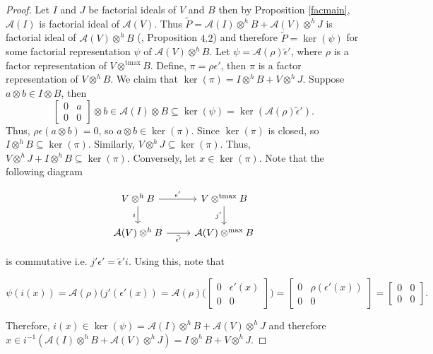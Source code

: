 \documentclass{birkjour}
\theoremstyle{definition}
\theoremstyle{remark}
\numberwithin{equation}{section}
\begin{document}
    \begin{proof}
     Let $I$ and $J$ be factorial ideals of $V$ and $B$ then by Proposition \ref{facmain}, $\mathcal{A}(I)$ is factorial ideal of $\mathcal{A}(V)$. Thus $\tilde{P}=\mathcal{A}(I) \otimes^h B+ \mathcal{A}(V) \otimes^h J$ is factorial ideal of $\mathcal{A}(V) \otimes^h B$ (\cite{AR}, Proposition $4.2$) and therefore $\tilde{P}= \operatorname{ker}(\psi)$ for some  factorial representation $\psi$ of $\mathcal{A}(V) \otimes^h B$. Let $\psi= \mathcal{A}(\rho)  \tilde{\epsilon}'$, where $\rho$ is a factor representation of $V \otimes^{\text{tmax}}B$. Define, $\pi= \rho  \epsilon'$, then $\pi$ is a factor representation of $V \otimes^h B$. We claim that $\operatorname{ker}(\pi)= I \otimes^h B+ V \otimes^h J$. Suppose $a \otimes b \in I \otimes B$, then  \[ 
\begin{bmatrix}
    0      & a \\
    0      & 0
\end{bmatrix}\otimes b  \in \mathcal{A}(I) \otimes B \subseteq \operatorname{ker}(\psi) =\operatorname{ker}(\mathcal{A}(\rho) \tilde{\epsilon}').
\] 
Thus, $\rho  \epsilon(a \otimes b)=0$, so $a \otimes b \in \operatorname{ker}(\pi)$. Since $\operatorname{ker}(\pi)$ is closed, so $I \otimes^h B \subseteq \operatorname{ker}(\pi)$. Similarly, $V \otimes^h J \subseteq \operatorname{ker}(\pi)$. Thus, $V \otimes^h J+ I \otimes^h B \subseteq \operatorname{ker}(\pi)$. Conversely, let $x \in \operatorname{ker}(\pi)$. Note that the following diagram


\[
\begin{tikzcd}
  V \otimes^h B
    \arrow[r, "\epsilon'"]
    \arrow[d, swap, "i"]
  &
  V \otimes^{\text{tmax}} B
    \arrow[d, swap, "j'"]
  \\
  \mathcal{A}(V) \otimes^h B
    \arrow[r, swap, "\tilde{\epsilon'}"]
  &
  \mathcal{A}(V)\otimes^{\mathrm{max}} B
\end{tikzcd}
\]
    

is commutative i.e. $j'  \epsilon'= \tilde{\epsilon}'i$. Using this, note that

  \[ \psi(i(x))=\mathcal{A}(\rho)  (j'(\epsilon'(x))=\mathcal{A}(\rho)
\Big (\begin{bmatrix}
    0      & \epsilon'(x) \\
    0      & 0
\end{bmatrix} \Big) = 
\begin{bmatrix}
         0    & \rho(\epsilon'(x)) \\
    0     & 0  
\end{bmatrix}=
\begin{bmatrix}
         0    & 0 \\
    0     & 0  
\end{bmatrix}.
\] 


Therefore,  $i(x) \in \operatorname{ker}(\psi)=\mathcal{A}(I) \otimes^h B+ \mathcal{A}(V) \otimes^h J$ and therefore $x \in i^{-1}(\mathcal{A}(I) \otimes^h B+ \mathcal{A}(V) \otimes^h J)= I \otimes^h B+ V \otimes^h J$.
\end{proof}
\end{document}
